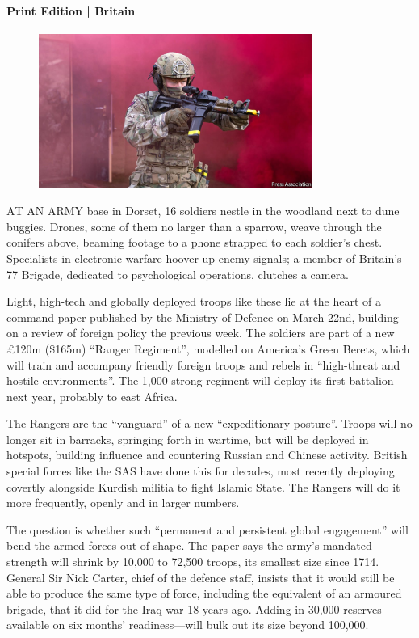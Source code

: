 \documentclass{article}
\begin{document}
\paragraph{Print Edition | Britain  \quad \color{gray}{Mar 27th 2021 }}
\begin{figure}[h]
\centering
\includegraphics[width=0.8\textwidth]{images/20210327_brp501.jpg}
\end{figure}
\lettrine{A}T AN ARMY base in Dorset, 16 soldiers nestle in the woodland next to dune buggies. Drones, some of them no larger than a sparrow, weave through the conifers above, beaming footage to a phone strapped to each soldier's chest. Specialists in electronic warfare hoover up enemy signals; a member of Britain's 77 Brigade, dedicated to psychological operations, clutches a camera. 

Light, high-tech and globally deployed troops like these lie at the heart of a command paper published by the Ministry of Defence on March 22nd, building on a review of foreign policy the previous week. The soldiers are part of a new £120m (\$165m) ``Ranger Regiment'', modelled on America's Green Berets, which will train and accompany friendly foreign troops and rebels in ``high-threat and hostile environments''. The 1,000-strong regiment will deploy its first battalion next year, probably to east Africa. 

The Rangers are the ``vanguard'' of a new ``expeditionary posture''. Troops will no longer sit in barracks, springing forth in wartime, but will be deployed in hotspots, building influence and countering Russian and Chinese activity. British special forces like the SAS have done this for decades, most recently deploying covertly alongside Kurdish militia to fight Islamic State. The Rangers will do it more frequently, openly and in larger numbers. 

The question is whether such ``permanent and persistent global engagement'' will bend the armed forces out of shape. The paper says the army's mandated strength will shrink by 10,000 to 72,500 troops, its smallest size since 1714. General Sir Nick Carter, chief of the defence staff, insists that it would still be able to produce the same type of force, including the equivalent of an armoured brigade, that it did for the Iraq war 18 years ago. Adding in 30,000 reserves---available on six months' readiness---will bulk out its size beyond 100,000. 
\end{document}
